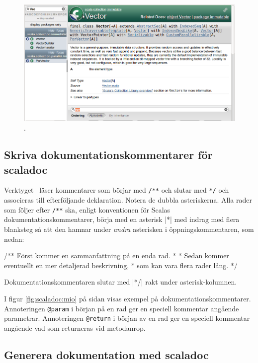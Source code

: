\begin{figure}[H]
\centering
\includegraphics[width=1.0\textwidth]{../img/scaladoc/scaladoc-vec}

     \caption{ \scaladoc.}
    \label{fig:scaladoc:vector}
\end{figure}


\subsection{Skriva dokumentationskommentarer för scaladoc}


Verktyget \scaladoc\ läser kommentarer som börjar med \verb|/**| och slutar med \verb|*/| och associeras till efterföljande deklaration. Notera de dubbla asteriskerna. Alla rader som följer efter \verb|/**| ska, enligt konventionen för Scalas dokumentationskommentarer, börja med en asterisk \code|*| med indrag med flera blanksteg så att den hamnar under \textit{andra} asterisken i öppningskommentaren, som nedan:
\begin{Code}
/** Först kommer en sammanfattning på en enda rad. 
  * 
  * Sedan kommer eventuellt en mer detaljerad beskrivning, 
  * som kan vara flera rader lång.
  */
\end{Code}
Dokumentationskommentaren slutar med \code|*/| rakt under asterisk-kolumnen.

I figur \ref{fig:scaladoc:mio} på sidan \pageref{fig:scaladoc:mio} visas exempel på dokumentationskommentarer. Annoteringen \verb|@param| i början på en rad ger en speciell kommentar angående parametrar. Annoteringen \verb|@return| i början av en rad ger en speciell kommentar angående vad som returneras vid metodanrop.


\subsection{Generera dokumentation med scaladoc}


